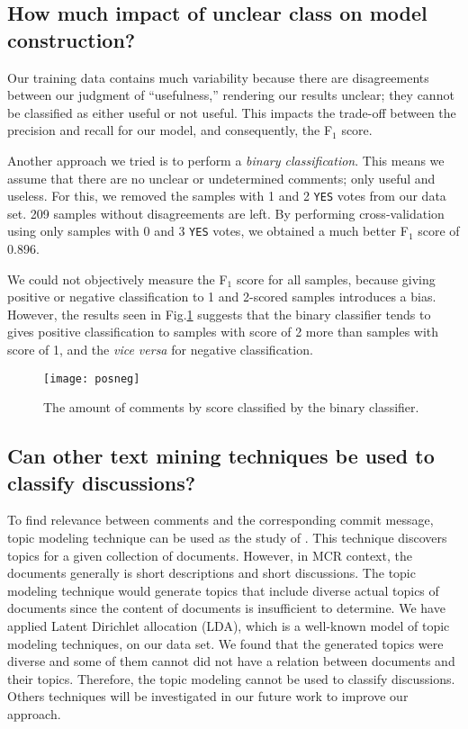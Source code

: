 \subsection{How much impact of unclear class on model construction?}
Our training data contains much variability because there are disagreements between our judgment of ``usefulness,'' rendering our results unclear; they cannot be classified as either useful or not useful.
This impacts the trade-off between the precision and recall for our model, and consequently, the F$_1$ score.

Another approach we tried is to perform a \emph{binary classification}.
This means we assume that there are no unclear or undetermined comments; only useful and useless.
For this, we removed the samples with 1 and 2 \texttt{YES} votes from our data set. 209 samples without disagreements are left.
By performing cross-validation using only samples with 0 and 3 \texttt{YES} votes, we obtained a much better F$_1$ score of 0.896.

We could not objectively measure the F$_1$ score for all samples, because giving positive or negative classification to 1 and 2-scored samples introduces a bias.
However, the results seen in Fig.\ref{fig:binary} suggests that the binary classifier tends to gives positive classification to samples with score of 2 more than samples with score of 1, and the \emph{vice versa} for negative classification. 

\begin{figure}[h]
\centering
\texttt{[image: posneg]}
\caption{The amount of comments by score classified by the binary classifier.}
\label{fig:binary}
\end{figure}
\subsection*{Can other text mining techniques be used to classify discussions?}
To find relevance between comments and the corresponding commit message, topic modeling technique can be used as the study of \cite{Barua2012a}. This technique discovers topics for a given collection of documents. However, in MCR context, the documents generally is short descriptions and short discussions. 
The topic modeling technique would generate topics that include diverse actual topics of documents since the content of documents is insufficient to determine. We have applied Latent Dirichlet allocation (LDA), which is a well-known model of topic modeling techniques, on our data set. We found that the generated topics were diverse and some of them cannot did not have a relation between documents and their topics. Therefore, the topic modeling cannot be used to classify discussions. Others techniques will be investigated in our future work to improve our approach.

